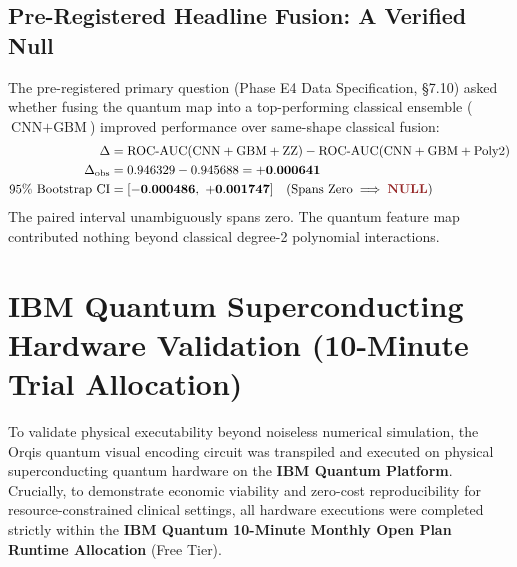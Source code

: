 \documentclass[11pt,a4paper]{report}
\newcommand{\vnull}{\textcolor{csred}{\textbf{NULL}}}
\begin{document}
\subsection{Pre-Registered Headline Fusion: A Verified Null}
The pre-registered primary question (Phase E4 Data Specification, \S7.10) asked whether fusing the quantum map into a top-performing classical ensemble ($\text{CNN} + \text{GBM}$) improved performance over same-shape classical fusion:
\begin{align}
  \Delta &= \text{ROC-AUC}(\text{CNN} + \text{GBM} + \text{ZZ}) - \text{ROC-AUC}(\text{CNN} + \text{GBM} + \text{Poly2}) \nonumber \\
  \Delta_\text{obs} &= 0.946329 - 0.945688 = \mathbf{+0.000641} \nonumber \\
  95\% \ \text{Bootstrap CI} &= \mathbf{[-0.000486, \ +0.001747]} \quad (\text{Spans Zero} \implies \vnull)
\end{align}
The paired interval unambiguously spans zero. The quantum feature map contributed nothing beyond classical degree-2 polynomial interactions.

\section{IBM Quantum Superconducting Hardware Validation (10-Minute Trial Allocation)}
To validate physical executability beyond noiseless numerical simulation, the Orqis quantum visual encoding circuit was transpiled and executed on physical superconducting quantum hardware on the \textbf{IBM Quantum Platform}. Crucially, to demonstrate economic viability and zero-cost reproducibility for resource-constrained clinical settings, all hardware executions were completed strictly within the \textbf{IBM Quantum 10-Minute Monthly Open Plan Runtime Allocation} (Free Tier).
\end{document}
